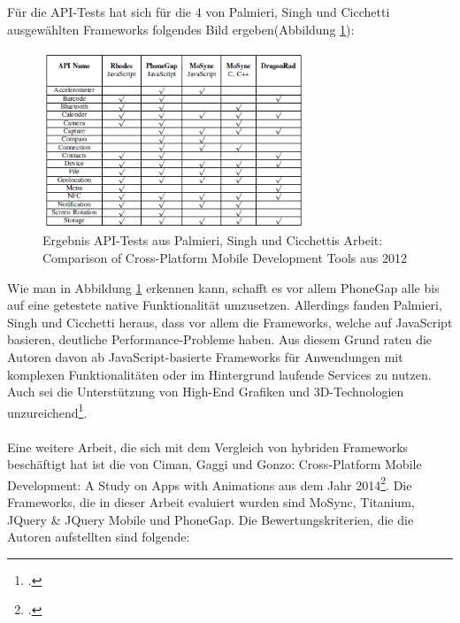 Für die API-Tests hat sich für die 4 von Palmieri, Singh und Cicchetti ausgewählten Frameworks folgendes Bild ergeben(Abbildung \ref{fig:Ergebnis_API_Test_Publ}): 

\begin{figure}[h]
	\centering
	\includegraphics[width=0.7\textwidth]{Bilder/Ergebnis_Sensornutzung_Comparison_of_Cross-Platform_Mob_Dev.PNG}
	\caption{Ergebnis API-Tests aus Palmieri, Singh und Cicchettis Arbeit: Comparison of Cross-Platform Mobile Development Tools aus 2012}
	\label{fig:Ergebnis_API_Test_Publ}
\end{figure}

Wie man in Abbildung \ref{fig:Ergebnis_API_Test_Publ} erkennen kann, schafft es vor allem PhoneGap alle bis auf eine getestete native Funktionalität umzusetzen. Allerdings fanden Palmieri, Singh und Cicchetti heraus, dass vor allem die Frameworks, welche auf JavaScript basieren, deutliche Performance-Probleme haben. Aus diesem Grund raten die Autoren davon ab JavaScript-basierte Frameworks für Anwendungen mit komplexen Funktionalitäten oder im Hintergrund laufende Services zu nutzen. Auch sei die Unterstützung von High-End Grafiken und 3D-Technologien unzureichend\footcite{ComparisonCrossPlatMobDevTools}. 
\\
\\
Eine weitere Arbeit, die sich mit dem Vergleich von hybriden Frameworks beschäftigt hat ist die von Ciman, Gaggi und Gonzo: Cross-Platform Mobile Development: A Study on Apps with Animations aus dem Jahr 2014\footcite{CrossPlatMobDevStudyAnim}. Die Frameworks, die in dieser Arbeit evaluiert wurden sind MoSync, Titanium, JQuery \& JQuery Mobile und PhoneGap. Die Bewertungskriterien, die die Autoren aufstellten sind folgende:

